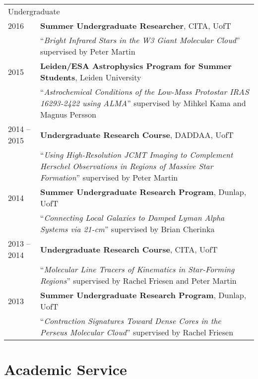 \documentclass[10pt]{res} %
\begin{document}
\begin{resume}
\begin{table}[h!]
\begin{tabularx}{\textwidth}{ @{} p{6.5em} X @{} }
\multicolumn{2}{l}{ \rule{0pt}{3ex} \large \hspace{-12pt} Undergraduate \dotfill \rule[-1.2ex]{0pt}{0pt}} \\ 
2016 & \textbf{Summer Undergraduate Researcher}, CITA, UofT \\
         & ``\textit{Bright Infrared Stars in the W3 Giant Molecular Cloud}'' supervised by Peter Martin \\
2015 & \textbf{Leiden/ESA Astrophysics Program for Summer Students}, Leiden University \\
         & ``\textit{Astrochemical Conditions of the Low-Mass Protostar IRAS 16293-2422 using ALMA}'' supervised by Mihkel Kama and Magnus Persson \\
2014 -- 2015 & \textbf{Undergraduate Research Course}, DADDAA, UofT \\
                     & ``\textit{Using High-Resolution JCMT Imaging to Complement Herschel Observations in Regions of Massive Star Formation}'' supervised by Peter Martin \\
2014 & \textbf{Summer Undergraduate Research Program}, Dunlap, UofT \\
         & ``\textit{Connecting Local Galaxies to Damped Lyman Alpha Systems via 21-cm}'' supervised by Brian Cherinka \\
2013 -- 2014 &\textbf{Undergraduate Research Course}, CITA, UofT \\
                     & ``\textit{Molecular Line Tracers of Kinematics in Star-Forming Regions}'' supervised by Rachel Friesen and Peter Martin \\
2013 & \textbf{Summer Undergraduate Research Program}, Dunlap, UofT \\
         & ``\textit{Contraction Signatures Toward Dense Cores in the Perseus Molecular Cloud}'' supervised by Rachel Friesen
\end{tabularx}
\end{table}


\newpage
\section{\Large Academic Service}
\vspace{-5pt} %
\noindent\makebox[\linewidth]{\rule{\textwidth}{0.4pt}}
\vspace{-20pt} %


\end{resume}
\end{document}
